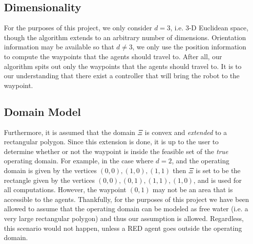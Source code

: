 \documentclass{article}
\begin{document}
\subsection{Dimensionality}
For the purposes of this project, we only consider $d = 3$, i.e. 3-D Euclidean space, though the algorithm extends to an arbitrary number of dimensions. Orientation information may be available so that $d \neq 3$, we only use the position information to compute the waypoints that the agents should travel to. After all, our algorithm spits out only the waypoints that the agents should travel to. It is to our understanding that there exist a controller that will bring the robot to the waypoint.
\subsection{Domain Model}
Furthermore, it is assumed that the domain $\Xi$ is convex and \textit{extended} to a rectangular polygon. Since this extension is done, it is up to the user to determine whether or not the waypoint is inside the feasible set of the \textit{true} operating domain. For example, in the case where $d = 2$, and the operating domain is given by the vertices $(0,0), (1,0), (1, 1)$ then $\Xi$ is set to be the rectangle given by the vertices $(0, 0), (0, 1), (1, 1), (1, 0)$, and is used for all computations. However, the waypoint $(0,1)$ may not be an area that is accessible to the agents. Thankfully, for the purposes of this project we have been allowed to assume that the operating domain can be modeled as free water (i.e. a very large rectangular polygon) and thus our assumption is allowed. Regardless, this scenario would not happen, unless a RED agent goes outside the operating domain.  
\end{document}
